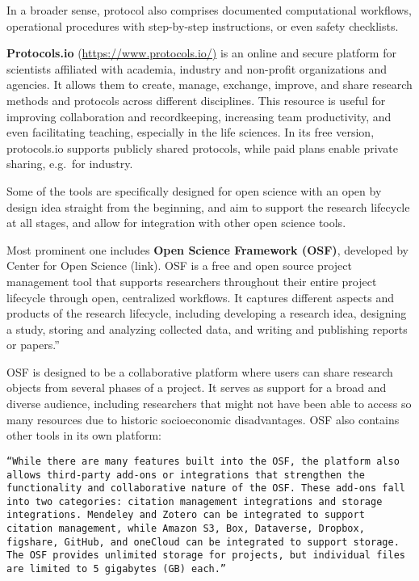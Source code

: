 \documentclass[
  letterpaper,
  DIV=11,
  numbers=noendperiod]{scrreport}
\begin{document}
In a broader sense, protocol also comprises documented computational
workflows, operational procedures with step-by-step instructions, or
even safety checklists.

\textbf{Protocols.io}
(\href{https://www.protocols.io/}{https://www.protocols.io/)} is an
online and secure platform for scientists affiliated with academia,
industry and non-profit organizations and agencies. It allows them to
create, manage, exchange, improve, and share research methods and
protocols across different disciplines. This resource is useful for
improving collaboration and recordkeeping, increasing team productivity,
and even facilitating teaching, especially in the life sciences. In its
free version, protocols.io supports publicly shared protocols, while
paid plans enable private sharing, e.g.~for industry.

Some of the tools are specifically designed for open science with an
open by design idea straight from the beginning, and aim to support the
research lifecycle at all stages, and allow for integration with other
open science tools.

Most prominent one includes \textbf{Open Science Framework (OSF)},
developed by Center for Open Science (link). OSF is a free and open
source project management tool that supports researchers throughout
their entire project lifecycle through open, centralized workflows. It
captures different aspects and products of the research lifecycle,
including developing a research idea, designing a study, storing and
analyzing collected data, and writing and publishing reports or
papers.''

OSF is designed to be a collaborative platform where users can share
research objects from several phases of a project. It serves as support
for a broad and diverse audience, including researchers that might not
have been able to access so many resources due to historic socioeconomic
disadvantages. OSF also contains other tools in its own platform:

\begin{verbatim}
“While there are many features built into the OSF, the platform also allows third-party add-ons or integrations that strengthen the functionality and collaborative nature of the OSF. These add-ons fall into two categories: citation management integrations and storage integrations. Mendeley and Zotero can be integrated to support citation management, while Amazon S3, Box, Dataverse, Dropbox, figshare, GitHub, and oneCloud can be integrated to support storage. The OSF provides unlimited storage for projects, but individual files are limited to 5 gigabytes (GB) each.”
\end{verbatim}
\end{document}
